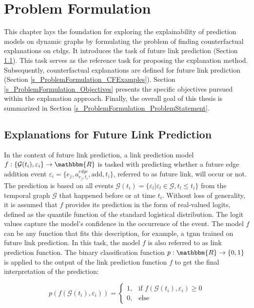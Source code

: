 \section{Problem Formulation}
\label{s_ProblemFormulation}

This chapter lays the foundation for exploring the explainability of prediction models on dynamic graphs by formulating the problem of finding counterfactual explanations on \glspl{ctdg}. It introduces the task of future link prediction (Section \ref{s_ProblemFormulation_Task}). This task serves as the reference task for proposing the explanation method. Subsequently, counterfactual explanations are defined for future link prediction (Section \ref{s_ProblemFormulation_CFExamples}). Section \ref{s_ProblemFormulation_Objectives} presents the specific objectives pursued within the explanation approach. Finally, the overall goal of this thesis is summarized in Section \ref{s_ProblemFormulation_ProblemStatement}.

\subsection{Explanations for Future Link Prediction}
\label{s_ProblemFormulation_Task}
In the context of future link prediction, a link prediction model $f: \{\mathcal{G}(t_i), \varepsilon_i\} \rightarrow \mathbbm{R}$ is tasked with predicting whether a future edge addition event $\varepsilon_{i} = \{e_j, a_{e_j, t_i}^{edge}, \mathrm{add}, t_i\}$, referred to as future link, will occur or not. The prediction is based on all events ${\mathcal{G}(t_i) = \{\varepsilon_{l} | \varepsilon_{l} \in \mathcal{G}, t_l \leq t_i\}}$ from the temporal graph $\mathcal{G}$ that happened before or at time $t_i$. Without loss of generality, it is assumed that $f$ provides its prediction in the form of real-valued logits, defined as the quantile function of the standard logistical distribution. The logit values capture the model's confidence in the occurrence of the event. The model $f$ can be any function that fits this description, for example, a \gls{tgnn} trained on future link prediction. In this task, the model $f$ is also referred to as link prediction function. The binary classification function $p: \mathbbm{R} \rightarrow \{0, 1\}$ is applied to the output of the link prediction function $f$ to get the final interpretation of the prediction:

\begin{equation}
    p(f(\mathcal{G}(t_i), \varepsilon_{i})) = 
    \begin{cases}
    1,  &\text{if } f(\mathcal{G}(t_i), \varepsilon_{i}) \geq 0 \\
    0,  &\text{else}
    \end{cases}
\end{equation}


